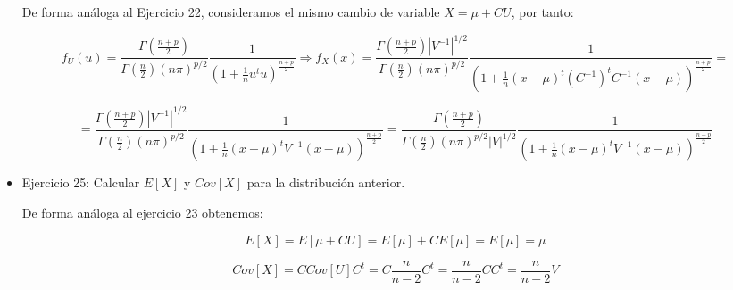 \documentclass{article}
\theoremstyle{theorem-style}  %
\theoremstyle{definition}
\theoremstyle{example-style}
\begin{document}
\begin{itemize}
		De forma análoga al Ejercicio 22, consideramos el mismo cambio de variable $X = \mu + CU$, por tanto:
		
		$$ f_U(u) = \frac{\Gamma(\frac{n+p}{2})}{\Gamma(\frac{n}{2}) (n \pi)^{p/2}} \frac{1}{(1 + \frac{1}{n}u^t u)^{\frac{n+p}{2}}} \Rightarrow f_X(x) = \frac{\Gamma(\frac{n+p}{2}) |V^{-1}|^{1/2} }{\Gamma(\frac{n}{2}) (n \pi)^{p/2}}  \frac{1}{(1 + \frac{1}{n}(x-\mu)^t (C^{-1})^t C^{-1} (x- \mu))^{\frac{n+p}{2}}}  = $$
		
		$$ =  \frac{\Gamma(\frac{n+p}{2}) |V^{-1}|^{1/2} }{\Gamma(\frac{n}{2}) (n \pi)^{p/2}}  \frac{1}{(1 + \frac{1}{n}(x-\mu)^t V^{-1}(x- \mu))^{\frac{n+p}{2}}} =  \frac{\Gamma(\frac{n+p}{2}) }{\Gamma(\frac{n}{2}) (n \pi)^{p/2} |V|^{1/2} }  \frac{1}{(1 + \frac{1}{n}(x-\mu)^t V^{-1}(x- \mu))^{\frac{n+p}{2}}} $$
		
		\item Ejercicio 25: Calcular $E[X]$ y $Cov[X]$ para la distribución anterior.
		
		De forma análoga al ejercicio 23 obtenemos:
		
		\[
			E[X] = E[\mu + CU] = E[\mu] + CE[\mu] = E[\mu] = \mu
		\]
		
		\[
			Cov[X] = C Cov[U] C^t = C \frac{n}{n-2} C^t = \frac{n}{n-2} C C^t = \frac{n}{n-2}  V 
		\]
		
	\end{itemize}
	
\end{document}
